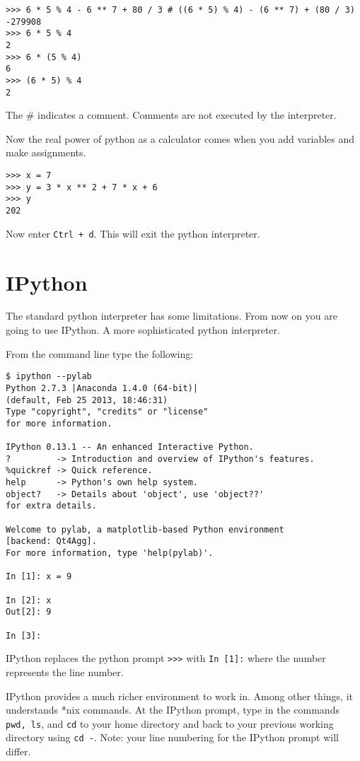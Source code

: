 \documentclass[12pt]{article}
\begin{document}
\begin{lstlisting}[style=bash]
>>> 6 * 5 % 4 - 6 ** 7 + 80 / 3 # ((6 * 5) % 4) - (6 ** 7) + (80 / 3)
-279908
>>> 6 * 5 % 4
2
>>> 6 * (5 % 4)
6
>>> (6 * 5) % 4
2
\end{lstlisting}

The \# indicates a comment. Comments are not executed by the interpreter.

Now the real power of python as a calculator comes when you add variables and make assignments.

\begin{lstlisting}[style=bash]
>>> x = 7
>>> y = 3 * x ** 2 + 7 * x + 6
>>> y
202
\end{lstlisting}

Now enter \texttt{Ctrl + d}. This will exit the python interpreter.

\section{IPython}

The standard python interpreter has some limitations. From now on you are going to use IPython. A more sophisticated python interpreter.

From the command line type the following:
\begin{lstlisting}[style=bash]
$ ipython --pylab 
Python 2.7.3 |Anaconda 1.4.0 (64-bit)| 
(default, Feb 25 2013, 18:46:31) 
Type "copyright", "credits" or "license" 
for more information.

IPython 0.13.1 -- An enhanced Interactive Python.
?         -> Introduction and overview of IPython's features.
%quickref -> Quick reference.
help      -> Python's own help system.
object?   -> Details about 'object', use 'object??' 
for extra details.

Welcome to pylab, a matplotlib-based Python environment 
[backend: Qt4Agg].
For more information, type 'help(pylab)'.

In [1]: x = 9

In [2]: x
Out[2]: 9

In [3]: 
\end{lstlisting}

IPython replaces the python prompt \texttt{>>>} with \texttt{In [1]:} where the number represents the line number.

IPython provides a much richer environment to work in. Among other things, it understands *nix commands. At the IPython prompt, type in the commands \texttt{pwd, ls}, and \texttt{cd} to your home directory and back to your previous working directory using \texttt{cd -}. Note: your line numbering for the IPython prompt will differ.
\end{document}
